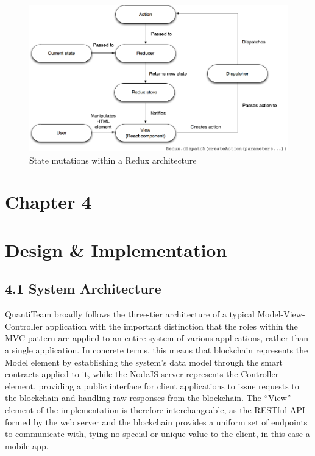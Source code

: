 \documentclass[12pt]{report}
\begin{document}
\begin{figure}[htbp]
\centering
\includegraphics{../diagrams/redux.png}
\caption{State mutations within a Redux architecture\cite{1reduxibm}}
\end{figure}

\clearpage

\section{Chapter 4}\label{chapter-4-1}

\section{Design \& Implementation}\label{design-implementation}

\subsection{4.1 System Architecture}\label{system-architecture}

QuantiTeam broadly follows the three-tier architecture of a typical
Model-View-Controller\cite{krasner1988description} application with the important distinction that the
roles within the MVC pattern are applied to an entire system of various
applications, rather than a single application. In concrete terms, this
means that blockchain represents the Model element by establishing the
system's data model through the smart contracts applied to it, while the
NodeJS server represents the Controller element, providing a public
interface for client applications to issue requests to the blockchain
and handling raw responses from the blockchain. The ``View'' element of
the implementation is therefore interchangeable, as the RESTful API
formed by the web server and the blockchain provides a uniform set of
endpoints to communicate with, tying no special or unique value to the
client, in this case a mobile app.
\end{document}
